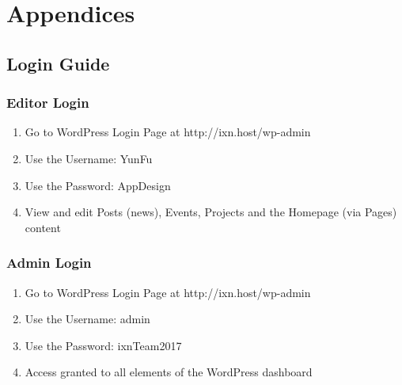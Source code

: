 \newpage

% 

\printbibliography


\newpage
\section{Appendices}

\subsection{Login Guide}
\subsubsection{Editor Login}

\begin{enumerate}

  \item Go to WordPress Login Page at http://ixn.host/wp-admin
  \item Use the Username: YunFu
  \item Use the Password: AppDesign
  \item View and edit Posts (news), Events, Projects and the Homepage (via Pages) content

\end{enumerate}

\subsubsection{Admin Login}
\begin{enumerate}

  \item Go to WordPress Login Page at http://ixn.host/wp-admin
  \item Use the Username: admin
  \item Use the Password: ixnTeam2017
  \item Access granted to all elements of the WordPress dashboard

\end{enumerate}

